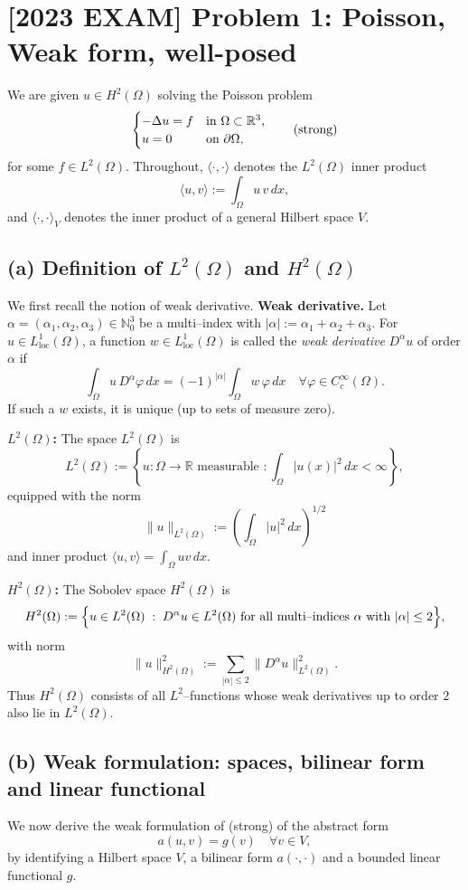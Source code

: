 \section*{[2023 EXAM] Problem 1: Poisson, Weak form, well-posed}
We are given $u\in H^2(\Omega)$ solving the Poisson problem
\[
  \begin{cases}
    - \Delta u = f & \text{in } \Omega \subset \mathbb{R}^3, \\
    u = 0          & \text{on } \partial\Omega,
  \end{cases}
  \tag{\text{strong}}
\]
for some $f\in L^2(\Omega)$.
Throughout, $\langle\cdot,\cdot\rangle$ denotes the $L^2(\Omega)$ inner product
\[
  \langle u,v\rangle := \displaystyle\int_\Omega u\,v\,dx,
\]
and $\langle\cdot,\cdot\rangle_V$ denotes the inner product of a general Hilbert space $V$.
\subsection*{(a) Definition of $L^2(\Omega)$ and $H^2(\Omega)$}
We first recall the notion of weak derivative.
\textbf{Weak derivative.}
Let $\alpha=(\alpha_1,\alpha_2,\alpha_3)\in\mathbb{N}_0^3$ be a multi--index with
$|\alpha| := \alpha_1+\alpha_2+\alpha_3$.
For $u\in L^1_{\mathrm{loc}}(\Omega)$, a function $w\in L^1_{\mathrm{loc}}(\Omega)$ is called
the \emph{weak derivative} $D^\alpha u$ of order $\alpha$ if
\[
  \int_\Omega u\, D^\alpha\varphi\,dx
  = (-1)^{|\alpha|}\int_\Omega w\,\varphi\,dx
  \quad\forall\varphi\in C_c^\infty(\Omega).
\]
If such a $w$ exists, it is unique (up to sets of measure zero).

\textbf{$L^2(\Omega)$:}
The space $L^2(\Omega)$ is
\[
  L^2(\Omega)
  := \left\{ u : \Omega\to\mathbb{R} \text{ measurable } :
  \int_\Omega |u(x)|^2\,dx < \infty \right\},
\]
equipped with the norm
\[
  \|u\|_{L^2(\Omega)} := \left(\int_\Omega |u|^2\,dx\right)^{1/2}
\]
and inner product $\langle u,v\rangle = \int_\Omega u v\,dx$.

\textbf{$H^2(\Omega)$:}
The Sobolev space $H^2(\Omega)$ is
\[
  H^2(\Omega)
  := \Bigl\{
  u \in L^2(\Omega) \;:\;
  D^\alpha u \in L^2(\Omega)
  \text{ for all multi--indices } \alpha \text{ with } |\alpha|\le 2
  \Bigr\},
\]
with norm
\[
  \|u\|_{H^2(\Omega)}^2
  := \sum_{|\alpha|\le 2} \|D^\alpha u\|_{L^2(\Omega)}^2.
\]
Thus $H^2(\Omega)$ consists of all $L^2$--functions whose weak derivatives up to order $2$
also lie in $L^2(\Omega)$.
\subsection*{(b) Weak formulation: spaces, bilinear form and linear functional}
We now derive the weak formulation of (strong) of the abstract form
\[
  a(u,v) = g(v)
  \quad\forall v\in V,
  \tag{2}
\]
by identifying a Hilbert space $V$, a bilinear form $a(\cdot,\cdot)$ and a bounded linear
functional $g$.

